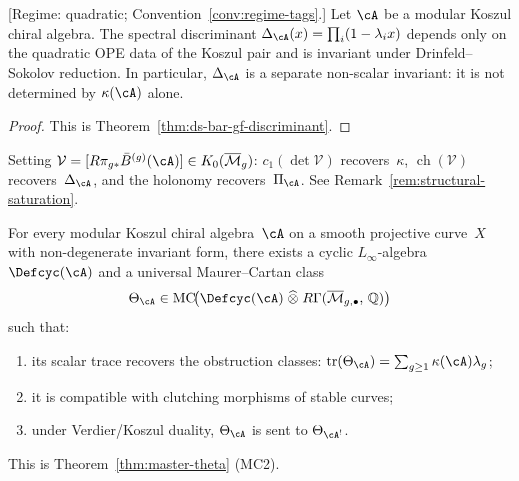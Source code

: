 \begin{theorem}
\label{thm:spectral-characteristic}

\smallskip\noindent
\textup{[Regime: quadratic;
Convention~\ref{conv:regime-tags}.]}
Let $\cA$ be a modular Koszul chiral algebra.
The spectral discriminant
$\Delta_{\cA}(x) = \prod_i (1 - \lambda_i x)$
depends only on the quadratic OPE data of the Koszul pair and is invariant
under Drinfeld--Sokolov reduction.
In particular, $\Delta_{\cA}$ is a separate non-scalar invariant:
it is not determined by $\kappa(\cA)$ alone.
\end{theorem}

\begin{proof}
This is Theorem~\ref{thm:ds-bar-gf-discriminant}.
\end{proof}

\begin{remark}\label{rem:spectral-characteristic-programme}
Setting $\mathcal{V}=[R\pi_{g*}\bar{B}^{(g)}(\cA)]\in
K_0(\overline{\mathcal{M}}_g)$: $c_1(\det\mathcal{V})$
recovers~$\kappa$, $\operatorname{ch}(\mathcal{V})$
recovers~$\Delta_{\cA}$, and the holonomy recovers~$\Pi_{\cA}$.
See Remark~\ref{rem:structural-saturation}.
\end{remark}

\begin{theorem}
\label{thm:universal-theta}
For every modular Koszul chiral algebra~$\cA$ on a smooth
projective curve~$X$ with non-degenerate invariant form,
there exists a cyclic $L_\infty$-algebra $\Defcyc(\cA)$ and a
universal Maurer--Cartan class
\[
\Theta_{\cA} \in
\operatorname{MC}\!\bigl(
  \Defcyc(\cA) \;\widehat{\otimes}\;
  R\Gamma(\overline{\mathcal{M}}_{g,\bullet},\, \mathbb{Q})
\bigr)
\]
such that:
\begin{enumerate}[label=\textup{(\roman*)}]
\item its scalar trace recovers the obstruction classes:
  $\operatorname{tr}(\Theta_{\cA})
  = \sum_{g \geq 1} \kappa(\cA) \lambda_g$;
\item it is compatible with clutching morphisms of stable curves;
\item under Verdier/Koszul duality, $\Theta_{\cA}$ is sent to
  $\Theta_{\cA^!}$.
\end{enumerate}
This is Theorem~\ref{thm:master-theta} (MC2).
\end{theorem}

